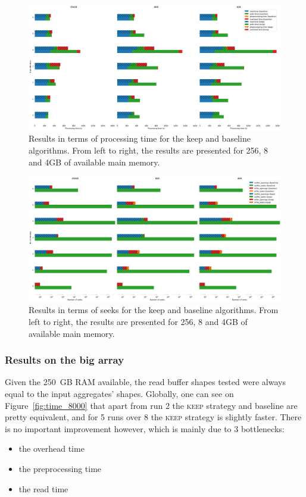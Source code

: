 \documentclass[sigconf, nonacm]{acmart}
\newcommand{\keep}[0]{\textsc{keep}\xspace}
\begin{document}
\begin{figure}[h]
  \centering
  \includegraphics[scale=0.36]{./figures/time_3500.png}
  \caption{Results in terms of processing time for the keep and baseline algorithms. From left to right, the results are presented for 256, 8 and 4GB of available main memory.}
  \label{fig:time_3500}
\end{figure}

\begin{figure}[h]
    \centering
    \includegraphics[scale=0.36]{./figures/seeks_3500.png}
    \caption{Results in terms of seeks for the keep and baseline algorithms. From left to right, the results are presented for 256, 8 and 4GB of available main memory.}
    \label{fig:seeks_3500}
  \end{figure}

\subsubsection{Results on the big array}

Given the 250~GB RAM available, the read buffer shapes tested were always equal to
the input aggregates' shapes.
Globally, one can see on Figure~\ref{fig:time_8000} that apart from run 2 the \keep
strategy and baseline are pretty equivalent, and for 5 runs over 8 the \keep
strategy is slightly faster.
There is no important improvement however, which is mainly due to 3 bottlenecks:
\begin{itemize}
  \item the overhead time
  \item the preprocessing time
  \item the read time
\end{itemize}
\end{document}
